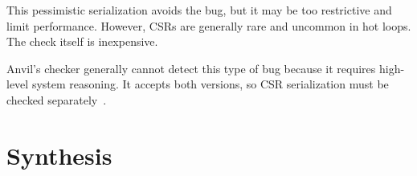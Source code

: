 \documentclass[conference]{IEEEtran}
\begin{document}
This pessimistic serialization avoids the bug, but it may be too restrictive
and limit performance. However, CSRs are generally rare and uncommon in hot
loops. The check itself is inexpensive.

Anvil's checker generally cannot detect this type of bug because it requires
high-level system reasoning.
It accepts both versions, so CSR serialization must be
checked separately~\cite{bug5-anvil-buggy,bug5-anvil-fixed,
bug5-anvil-results}.











\onecolumn
\section{Synthesis}
\end{document}
